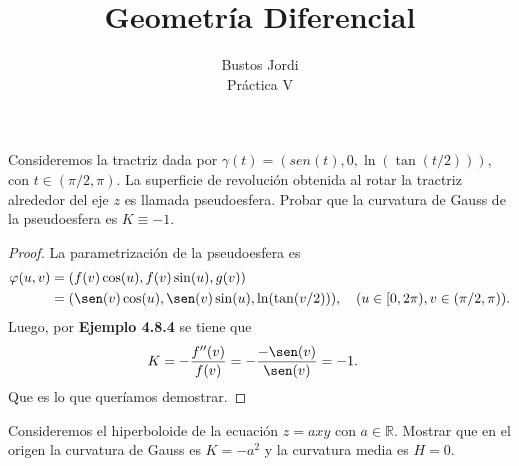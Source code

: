 \documentclass{article}
\newcommand{\R}{\mathbb{R}}
\newenvironment{theorem}[2][Ejercicio]{\begin{trivlist}
\item[\hskip \labelsep {\bfseries #1}\hskip \labelsep {\bfseries #2.}]}{\end{trivlist}}
\begin{document}
\title{Geometría Diferencial}
\author{Bustos Jordi\\Práctica V}

\maketitle

\begin{theorem}{1}
    Consideremos la tractriz dada por \( \gamma(t) = (sen(t), 0, \ln(\tan(t/2))) \), con \( t \in (\pi/2, \pi) \). La superficie de revolución obtenida al rotar la tractriz alrededor del eje \( z \) es llamada
    pseudoesfera. Probar que la curvatura de Gauss de la pseudoesfera es \( K \equiv -1 \).
\end{theorem}

\begin{proof}
    La parametrización de la pseudoesfera es \begin{align*}
        \varphi(u, v) & = (f(v) \cos(u), f(v) \sin(u), g(v))                                                               \\
                      & = (\sen(v) \cos(u), \sen(v) \sin(u), \ln(\tan(v/2))), \quad (u \in [0, 2\pi), v \in (\pi/2, \pi)).
    \end{align*}
    Luego, por \textbf{Ejemplo 4.8.4} se tiene que \begin{align*}
        K & = -\frac{f''(v)}{f(v)} = -\frac{-\sen(v)}{\sen(v)} = -1.
    \end{align*}
    Que es lo que queríamos demostrar.
\end{proof}

\vspace{1em}

\begin{theorem}{2}
    Consideremos el hiperboloide de la ecuación \( z = axy \) con \( a \in \R \). Mostrar que en el origen la curvatura de Gauss es \( K = -a^2 \) y la curvatura media es \( H = 0 \).
\end{theorem}
\end{document}
